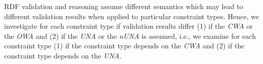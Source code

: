 \documentclass{acm_proc_article-sp}
\newcommand{\ms}[1]{%
  \texttt{#1}
}
\begin{document}
RDF validation and reasoning assume different semantics which may lead to different validation results when applied to particular constraint types.
Hence, we investigate for each constraint type if validation results differ (1) if the \emph{CWA} or the \emph{OWA} and (2) if the \emph{UNA} or the \emph{nUNA}
is assumed, i.e., we examine for each constraint type (1) if the constraint type depends on the \emph{CWA} and (2) if the constraint type depends on the \emph{UNA}.

\end{document}
